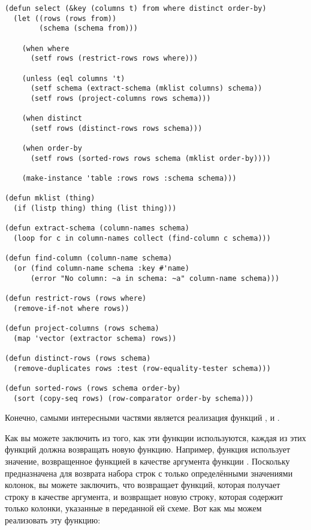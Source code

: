 \begin{lstlisting}
(defun select (&key (columns t) from where distinct order-by)
  (let ((rows (rows from))
        (schema (schema from)))

    (when where
      (setf rows (restrict-rows rows where)))

    (unless (eql columns 't)
      (setf schema (extract-schema (mklist columns) schema))
      (setf rows (project-columns rows schema)))

    (when distinct
      (setf rows (distinct-rows rows schema)))

    (when order-by
      (setf rows (sorted-rows rows schema (mklist order-by))))

    (make-instance 'table :rows rows :schema schema)))

(defun mklist (thing)
  (if (listp thing) thing (list thing)))

(defun extract-schema (column-names schema)
  (loop for c in column-names collect (find-column c schema)))

(defun find-column (column-name schema)
  (or (find column-name schema :key #'name)
      (error "No column: ~a in schema: ~a" column-name schema)))

(defun restrict-rows (rows where)
  (remove-if-not where rows))

(defun project-columns (rows schema)
  (map 'vector (extractor schema) rows))

(defun distinct-rows (rows schema)
  (remove-duplicates rows :test (row-equality-tester schema)))

(defun sorted-rows (rows schema order-by)
  (sort (copy-seq rows) (row-comparator order-by schema)))
\end{lstlisting}

Конечно, самыми интересными частями  является реализация функций
,  и .

Как вы можете заключить из того, как эти функции используются, каждая из этих функций
должна возвращать новую функцию.  Например, функция  использует
значение, возвращенное функцией  в качестве аргумента функции .
Поскольку  предназначена для возврата набора строк с только
определёнными значениями колонок, вы можете заключить, что  возвращает
функций, которая получает строку в качестве аргумента, и возвращает новую строку, которая
содержит только колонки, указанные в переданной ей схеме.  Вот как мы можем реализовать
эту функцию:

